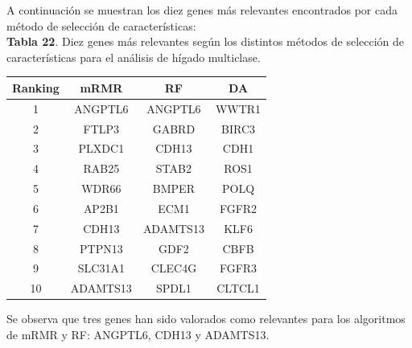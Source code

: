 A continuación se muestran los diez genes más relevantes encontrados por cada método de selección de características:\\

\textbf{Tabla 22}. Diez genes más relevantes según los distintos métodos de selección de características para el análisis de hígado multiclase.

\begin{table}[H]
	\centering
	\begin{tabular}{cccc}
		\hline
		\textbf{Ranking} & \multicolumn{1}{c}{\textbf{mRMR}} & \multicolumn{1}{c}{\textbf{RF}} & \multicolumn{1}{c}{\textbf{DA}} \\ \hline
		1                & ANGPTL6                           & ANGPTL6                         & WWTR1                           \\
		2                & FTLP3                             & GABRD                           & BIRC3                           \\
		3                & PLXDC1                            & CDH13                           & CDH1                            \\
		4                & RAB25                             & STAB2                           & ROS1                            \\
		5                & WDR66                             & BMPER                           & POLQ                            \\
		6                & AP2B1                             & ECM1                            & FGFR2                           \\
		7                & CDH13                             & ADAMTS13                        & KLF6                            \\
		8                & PTPN13                            & GDF2                            & CBFB                            \\
		9                & SLC31A1                           & CLEC4G                          & FGFR3                           \\
		10               & ADAMTS13                          & SPDL1                           & CLTCL1                          \\ \hline
	\end{tabular}
\end{table}

Se observa que tres genes han sido valorados como relevantes para los algoritmos de mRMR y RF:  ANGPTL6, CDH13 y ADAMTS13.

